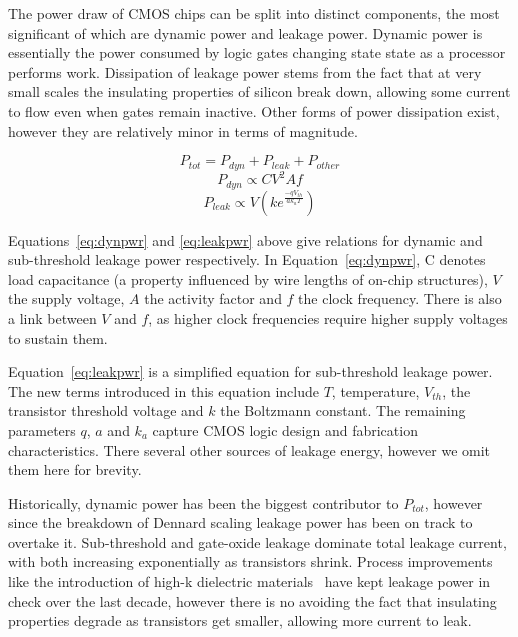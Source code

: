 The power draw of CMOS chips can be split into distinct components, the most significant of which are dynamic power and leakage power. Dynamic power is essentially the power consumed by logic gates changing state state as a processor performs work. Dissipation of leakage power stems from the fact that at very small scales the insulating properties of silicon break down, allowing some current to flow even when gates remain inactive. Other forms of power dissipation exist, however they are relatively minor in terms of magnitude. \golden

\begin{equation}
\label{eq:totpwr}
P_{tot} = P_{dyn} + P_{leak} + P_{other}
\end{equation}
\begin{equation} 
\label{eq:dynpwr}
P_{dyn} \propto CV^{2}Af
\end{equation}
\begin{equation}
\label{eq:leakpwr}
P_{leak} \propto V\left(ke^{\frac{-qV_{th}}{ak_{a}T}}\right)
\end{equation}

Equations~\ref{eq:dynpwr} and \ref{eq:leakpwr} above give relations for dynamic and sub-threshold leakage power respectively. In Equation~\ref{eq:dynpwr}, C denotes load capacitance (a property influenced by wire lengths of on-chip structures), $V$ the supply voltage, $A$ the activity factor and $f$ the clock frequency. There is also a link between $V$ and $f$, as higher clock frequencies require higher supply voltages to sustain them. \golden

Equation~\ref{eq:leakpwr} is a simplified equation for sub-threshold leakage power. The new terms introduced in this equation include $T$, temperature, $V_{th}$, the transistor threshold voltage and $k$ the Boltzmann constant. The remaining parameters $q$, $a$ and $k_{a}$ capture CMOS logic design and fabrication characteristics. There several other sources of leakage energy, however we omit them here for brevity.\golden

Historically, dynamic power has been the biggest contributor to $P_{tot}$, however since the breakdown of Dennard scaling leakage power has been on track to overtake it.  Sub-threshold and gate-oxide leakage dominate total leakage current, with both increasing exponentially as transistors shrink. Process improvements like the introduction of high-k dielectric materials~\cite{jan:2009aa} have kept leakage power in check over the last decade, however there is no avoiding the fact that insulating properties degrade as transistors get smaller, allowing more current to leak. \golden

